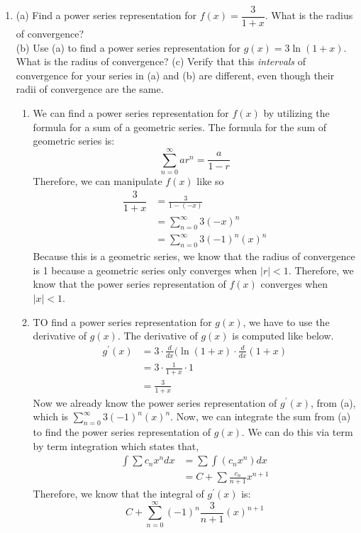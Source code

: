 \documentclass{article}
\begin{document}
\begin{enumerate}[label=\textbf{(14.\arabic*)}]

\item (a) Find a power series representation for $\displaystyle f(x)=\dfrac{3}{1+x}$. What is the radius of convergence?\\
(b) Use (a) to find a power series representation for $\displaystyle g(x)=3\ln(1+x)$. What is the radius of convergence?
\newline
(c) Verify that this \textit{intervals} of convergence for your series in (a) and (b) are different, even though their radii of convergence are the same.\\

\begin{enumerate}
\item We can find a power series representation for $f(x)$ by utilizing the formula for a sum of a geometric series. The formula for the sum of geometric series is:
\[\sum_{n=0}^\infty ar^n=\frac{a}{1-r}\]
Therefore, we can manipulate $f(x)$ like so
\begin{align*}
    \dfrac{3}{1+x} &= \frac{3}{1-(-x)}\\
    &= \sum_{n=0}^\infty 3(-x)^n\\
    &= \sum_{n=0}^\infty 3(-1)^n(x)^n
\end{align*}
Because this is a geometric series, we know that the radius of convergence is 1 because a geometric series only converges when $|r|<1$. Therefore, we know that the power series representation of $f(x)$ converges when
$|x|<1$.
\item TO find a power series representation for $g(x)$, we have to use the derivative of $g(x)$. The derivative of $g(x)$ is computed like below.
\begin{align*}
    g^\prime(x) &= 3\cdot \frac{d}{dx}(\ln(1+x)\cdot\frac{d}{dx}(1+x)\\
    &= 3\cdot\frac{1}{1+x}\cdot1\\
    &= \frac{3}{1+x}
\end{align*}
Now we already know the power series representation of $g^\prime(x)$, from (a), which is $\displaystyle \sum_{n=0}^\infty 3(-1)^n(x)^n$. Now, we can integrate the sum from (a) to find the power series representation of $g(x)$. We can do this via term by term integration which states that,
\begin{align*}
    \int\sum c_nx^n dx&= \sum \int (c_n x^n)dx\\
    &= C+\sum \frac{c_n}{n+1}x^{n+1}
\end{align*}
Therefore, we know that the integral of $g^\prime(x)$ is:
\[C+\sum_{n=0}^\infty (-1)^n\frac{3}{n+1}(x)^{n+1}\]


\end{enumerate}
\end{enumerate}
\end{document}

